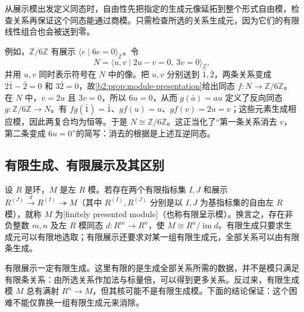 从展示模出发定义同态时，自由性先把指定的生成元像延拓到整个形式自由模，检查关系再保证这个同态能通过商模。只需检查所选的关系生成元，因为它们的有限线性组合也会被送到零。

\ProseParagraphBreak
例如，\(\mathbb Z/6\mathbb Z\) 有展示 \(\langle e\mid6e=0\rangle_{\mathbb Z}\)。令
\[
	N=\langle u,v\mid2u-v=0,\ 3v=0\rangle_{\mathbb Z},
\]
并用 \(u,v\) 同时表示符号在 \(N\) 中的像。把 \(u,v\) 分别送到 \(\bar1,\bar2\)，两条关系变成 \(2\bar1-\bar2=0\) 和 \(3\bar2=0\)，故\cref{b2:prop:module-presentation}给出同态 \(f:N\to\mathbb Z/6\mathbb Z\)。在 \(N\) 中，\(v=2u\) 且 \(3v=0\)，所以 \(6u=0\)，从而 \(g(\bar a)=au\) 定义了反向同态 \(g:\mathbb Z/6\mathbb Z\to N\)。有 \(fg(\bar1)=\bar1\)、\(gf(u)=u\)、\(gf(v)=2u=v\)；这些元素生成相应模，因此两复合均为恒等。于是 \(N\cong\mathbb Z/6\mathbb Z\)。这正当化了“第一条关系消去 \(v\)，第二条变成 \(6u=0\)”的简写：消去的根据是上述互逆同态。

\subsection{有限生成、有限展示及其区别}
\label{b2:subsec:0302:02}

\begin{definition}\label{b2:def:finitely-presented}
	设 \(R\) 是环，\(M\) 是左 \(R\) 模。若存在两个有限指标集 \(I,J\) 和展示 \(R^{(J)}\xrightarrow{d}R^{(I)}\twoheadrightarrow M\)（其中 \(R^{(I)},R^{(J)}\) 分别是以 \(I,J\) 为基指标集的自由左 \(R\) 模），就称 \(M\) 为[finitely presented module]（也称有限呈示模）。换言之，存在非负整数 \(m,n\) 及左 \(R\) 模同态 \(d:R^m\to R^n\)，使 \(M\cong R^n/\operatorname{im}d\)。有限生成只要求生成元可以有限地选取；有限展示还要求对某一组有限生成元，全部关系可以由有限条生成。
\end{definition}

有限展示一定有限生成。这里有限的是生成全部关系所需的数据，并不是模只满足有限条关系：由所选关系作加法与标量倍，可以得到更多关系。反过来，有限生成模 \(M\) 总有满射 \(R^n\to M\)，但其核可能不是有限生成模。下面的结论保证：这个困难不能仅靠换一组有限生成元来消除。

